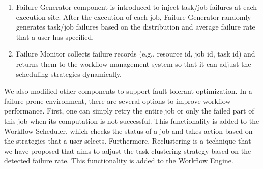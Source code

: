\begin{enumerate}
\item Failure Generator component is introduced to inject task/job failures at each execution site. After the execution of each job, Failure Generator randomly generates task/job failures based on the distribution and average failure rate that a user has specified. 
\item Failure Monitor collects failure records (e.g., resource id, job id, task id) and returns them to the workflow management system so that it can adjust the scheduling strategies dynamically. 
\end{enumerate}
We also modified other components to support fault tolerant optimization. In a failure-prone environment, there are several options to improve workflow performance. First, one can simply retry the entire job or only the failed part of this job when its computation is not successful. This functionality is added to the Workflow Scheduler, which checks the status of a job and takes action based on the strategies that a user selects. Furthermore, Reclustering is a technique that we have proposed \cite{Chen2012} that aims to adjust the task clustering strategy based on the detected failure rate. This functionality is added to the Workflow Engine. 

